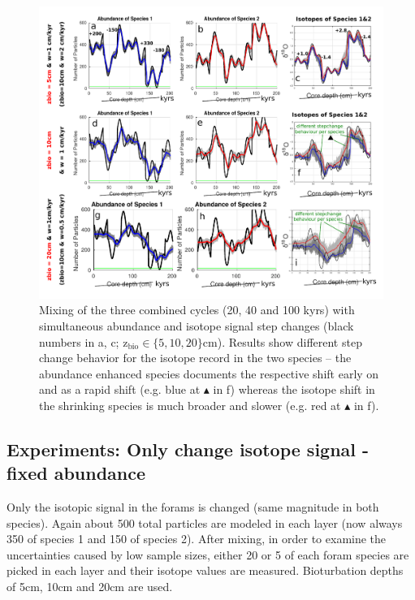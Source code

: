 \documentclass[a4paper,oneside,9pt]{article}
\begin{document}
\begin{figure}[hbp]
\begin{center}
	\includegraphics[width=1.0\textwidth]{../figures/../figures/Allcycles_combined_stepevent_bigger_5+10+20cm_background.pdf}
	\caption{Mixing of the three combined cycles (20, 40 and 100 kyrs) with simultaneous abundance and isotope signal step changes (black numbers in a, c; z$_\mathrm{bio} \in \{5,10,20 \}$cm). 
	Results show different step change behavior for the isotope record in the two species -- the abundance enhanced species documents the respective shift early on and as a rapid shift 
	(e.g. blue at $\blacktriangle$ in f) whereas the isotope shift in the shrinking species is much broader and slower (e.g. red at $\blacktriangle$ in f).}\label{fig:allcyclescombined_stepchange}
\end{center}
\end{figure}


\newpage
\subsection{Experiments: Only change isotope signal - fixed abundance}
Only the isotopic signal in the forams is changed (same magnitude in both species). Again about 500 total particles are modeled in each layer (now always 350 of species 1 and 150 of species 2). 
After mixing, in order to examine the uncertainties caused by low sample sizes, either 20 or 5 of each foram species are picked in each layer and their isotope values are measured.
Bioturbation depths of 5cm, 10cm and 20cm are used. 
\end{document}
